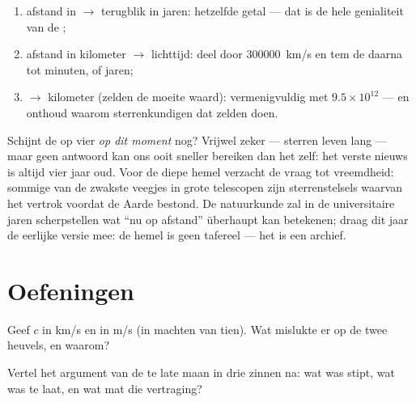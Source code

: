 \begin{method}\label{met:g8:speed-of-light:convert}
\begin{enumerate}
  \item afstand in  $\to$ terugblik in jaren: hetzelfde
        getal --- dat is de hele genialiteit van de
        ;
  \item afstand in kilometer $\to$ lichttijd: deel door
        \qty{300000}{km/s} en tem de  daarna tot minuten,
         of jaren;
  \item {} $\to$ kilometer (zelden de moeite waard):
        vermenigvuldig met $9.5 \times 10^{12}$ --- en onthoud waarom
        sterrenkundigen dat zelden doen.
\end{enumerate}
\end{method}

\begin{remark}\label{rem:g8:speed-of-light:now}
Schijnt de  op vier  \emph{op dit moment}
nog? Vrijwel zeker --- sterren leven lang --- maar geen antwoord
kan ons ooit sneller bereiken dan het  zelf: het verste
nieuws is altijd vier jaar oud. Voor de diepe hemel verzacht de vraag
tot vreemdheid: sommige van de zwakste veegjes in grote telescopen zijn
sterrenstelsels waarvan het  vertrok voordat de Aarde
bestond. De natuurkunde zal in de universitaire jaren scherpstellen wat
``nu op afstand'' überhaupt kan betekenen; draag dit jaar de eerlijke
versie mee: de hemel is geen tafereel --- het is een archief.
\end{remark}

\section{Oefeningen}

\begin{exercise}[$\star$]\label{exo:g8:speed-of-light:1}
Geef $c$ in \unit{km/s} en in \unit{m/s} (in machten van tien). Wat
mislukte er op de twee heuvels, en waarom?
\end{exercise}

\begin{exercise}[$\star$]\label{exo:g8:speed-of-light:2}
Vertel het argument van de te late maan in drie zinnen na: wat was
stipt, wat was te laat, en wat mat die vertraging?
\end{exercise}

